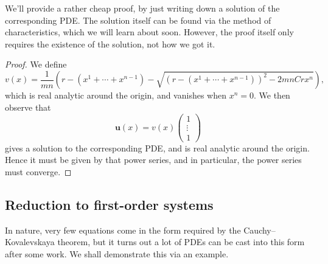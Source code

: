 \documentclass[a4paper]{article}
\begin{document}
We'll provide a rather cheap proof, by just writing down a solution of the corresponding PDE. The solution itself can be found via the method of characteristics, which we will learn about soon. However, the proof itself only requires the existence of the solution, not how we got it.
\begin{proof}
  We define
  \[
    v(x) = \frac{1}{mn} \left(r - (x^1 + \cdots + x^{n - 1}) - \sqrt{(r - (x^1 + \cdots + x^{n - 1}))^2 - 2mn Cr x^n}\right),
  \]
  which is real analytic around the origin, and vanishes when $x^n = 0$. We then observe that
  \[
    \mathbf{u}(x) = v(x)
    \begin{pmatrix}
      1\\\vdots\\1
    \end{pmatrix}
  \]
  gives a solution to the corresponding PDE, and is real analytic around the origin. Hence it must be given by that power series, and in particular, the power series must converge.
\end{proof}

%

\subsection{Reduction to first-order systems}

In nature, very few equations come in the form required by the Cauchy--Kovalevskaya theorem, but it turns out a lot of PDEs can be cast into this form after some work. We shall demonstrate this via an example.
\end{document}
